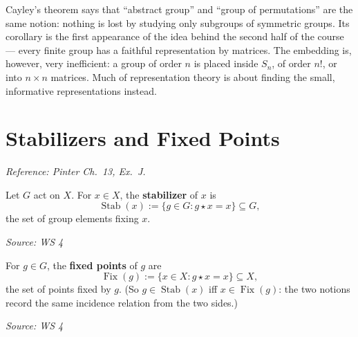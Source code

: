 \documentclass[11pt]{report}
\newcommand{\srcline}[1]{\par\hfill{\footnotesize\textit{Source: #1}}}
\begin{document}
\begin{center}
\label{fig:matrix-group}
\end{center}


\begin{rembox}\label{rem:why-cayleys-theorem-matters-why-not-end}
Cayley's theorem says that ``abstract group'' and ``group of permutations'' are the same notion: nothing is lost by studying only subgroups of symmetric groups. Its corollary is the first appearance of the idea behind the second half of the course --- every finite group has a faithful representation by matrices. The embedding is, however, very inefficient: a group of order $n$ is placed inside $S_n$, of order $n!$, or into $n \times n$ matrices. Much of representation theory is about finding the small, informative representations instead.
\end{rembox}



\section{Stabilizers and Fixed Points}\label{sec:stabilizers}

\textit{Reference: Pinter Ch.\ 13, Ex.\ J.}

\begin{defbox}[{Stabilizer}]\label{def:stabilizer-fixed-points}
Let $G$ act on $X$. For $x \in X$, the \textbf{stabilizer} of $x$ is
\[ \operatorname{Stab}(x) := \{ g \in G : g \star x = x \} \subseteq G, \]
the set of group elements fixing $x$.
\srcline{WS 4}
\end{defbox}

\begin{defbox}\label{def:fixed-points}
For $g \in G$, the \textbf{fixed points} of $g$ are
\[ \operatorname{Fix}(g) := \{ x \in X : g \star x = x \} \subseteq X, \]
the set of points fixed by $g$. (So $g \in \operatorname{Stab}(x)$ iff $x \in \operatorname{Fix}(g)$: the two notions record the same incidence relation from the two sides.)
\srcline{WS 4}
\end{defbox}
\end{document}
